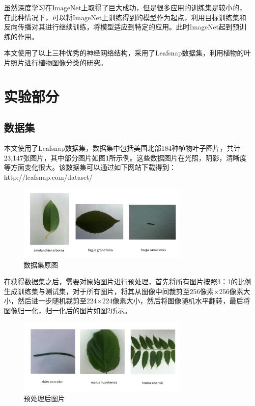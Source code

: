 \documentclass[a4paper]{ctexart} %
\begin{document}
虽然深度学习在ImageNet上取得了巨大成功，但是很多应用的训练集是较小的，在此种情况下，可以将ImageNet上训练得到的模型作为起点，利用目标训练集和反向传播对其进行继续训练，将模型适应到特定的应用。此时ImageNet起到预训练的作用。

本文使用了以上三种优秀的神经网络结构，采用了Leafsnap数据集，利用植物的叶片照片进行植物图像分类的研究。

\section*{实验部分}
\subsection*{数据集}
本文使用了Leafsnap\parencite{leafsnap}数据集，数据集中包括美国北部184种植物叶子图片，共计23,147张图片，其中部分图片如图1所示例。这些数据图片在光照，阴影，清晰度等方面变化很大。该数据集可以通过如下网站下载得到：http://leafsnap.com/dataset/
\begin{figure}[htbp]
	\centering
	\includegraphics[width=0.75\textwidth]{img1.png}
	\caption{数据集原图}
	\label{figure}
\end{figure}


在获得数据集之后，需要对原始图片进行预处理，首先将所有图片按照3：1的比例生成训练集与测试集，对于所有图片，将其从图像中间裁剪至256像素×256像素大小，然后进一步随机裁剪至224×224像素大小，然后将图像随机水平翻转，最后将图像归一化，归一化后的图片如图2所示。

\begin{figure}[htbp]
	\centering
	\includegraphics[width=0.75\textwidth]{img2.png}
	\caption{预处理后图片}
	\label{figure}
\end{figure}
\end{document}
